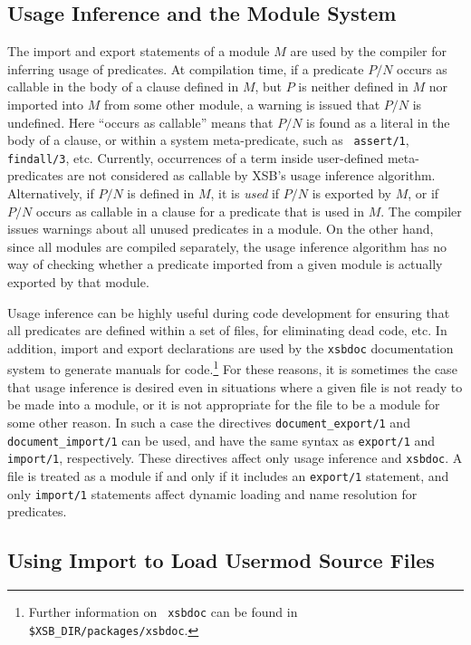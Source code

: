 \subsection{Usage Inference and the Module System}
The import and export statements of a module $M$ are used by the
compiler for inferring usage of predicates.  At compilation time, if a
predicate $P/N$ occurs as callable in the body of a clause defined in
$M$, but $P$ is neither defined in $M$ nor imported into $M$ from some
other module, a warning is issued that $P/N$ is undefined.  Here
``occurs as callable'' means that $P/N$ is found as a literal in the
body of a clause, or within a system meta-predicate, such as {\tt
assert/1}, {\tt findall/3}, etc.  Currently, occurrences of a term
inside user-defined meta-predicates are not considered as callable by
XSB's usage inference algorithm.  Alternatively, if $P/N$ is defined in
$M$, it is {\em used} if $P/N$ is exported by $M$, or if $P/N$ occurs
as callable in a clause for a predicate that is used in $M$.  The
compiler issues warnings about all unused predicates in a module.  On
the other hand, since all modules are compiled separately, the usage
inference algorithm has no way of checking whether a predicate
imported from a given module is actually exported by that module.

Usage inference can be highly useful during code development for
ensuring that all predicates are defined within a set of files, for
eliminating dead code, etc.  In addition, import and export
declarations are used by the {\tt xsbdoc} documentation system to
generate manuals for code.\footnote{Further information on {\tt
xsbdoc} can be found in {\tt \$XSB\_DIR/packages/xsbdoc}.}  For these
reasons, it is sometimes the case that usage inference is desired even
in situations where a given file is not ready to be made into a
module, or it is not appropriate for the file to be a module for some
other reason.  In such a case the directives {\tt document\_export/1}
and {\tt document\_import/1} can be used, and have the same syntax as 
{\tt export/1} and {\tt import/1}, respectively.  These directives
affect only usage inference and {\tt xsbdoc}.  A file is treated as a
module if and only if it includes an {\tt export/1} statement, and
only {\tt import/1} statements affect dynamic loading and name
resolution for predicates.

\subsection{Using Import to Load Usermod Source Files}

